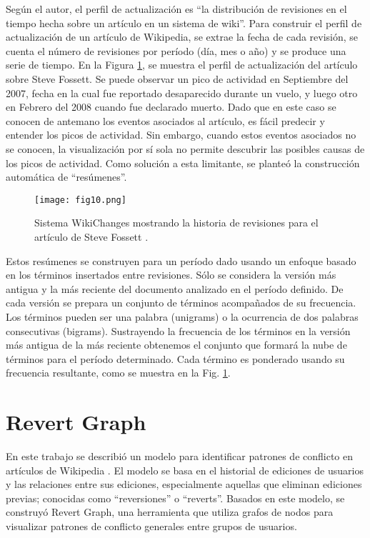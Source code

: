 Según el autor, el perfil de actualización es “la distribución de revisiones en el tiempo hecha sobre un artículo en un sistema de wiki”. Para construir el perfil de actualización de un artículo de Wikipedia, se extrae la fecha de cada revisión, se cuenta el número de revisiones por período (día, mes o año) y se produce una serie de tiempo.
En la Figura \ref{fig:fig10}, se muestra el perfil de actualización del artículo sobre Steve Fossett. Se puede observar un pico de actividad en Septiembre del 2007, fecha en la cual fue reportado desaparecido durante un vuelo, y luego otro en Febrero del 2008 cuando fue declarado muerto. Dado que en este caso se conocen de antemano los eventos asociados al artículo, es fácil predecir y entender los picos de actividad. Sin embargo, cuando estos eventos asociados no se conocen, la visualización por sí sola no permite descubrir las posibles causas de los picos de actividad. Como solución a esta limitante, se planteó la construcción automática de “resúmenes”.

\begin{figure}[htp]
  \centering
  \texttt{[image: fig10.png]}
  \caption[Sistema WikiChanges mostrando la historia de revisiones para el artículo de Steve Fossett]{Sistema WikiChanges mostrando la historia de revisiones para el artículo de Steve Fossett \cite[Fig. 3]{Nun08}.}
  \label{fig:fig10}
\end{figure}

Estos resúmenes se construyen para un período dado usando un enfoque basado en los términos insertados entre revisiones. Sólo se considera la versión más antigua y la más reciente del documento analizado en el período definido. De cada versión se prepara un conjunto de términos acompañados de su frecuencia. Los términos pueden ser una palabra (unigrams) o  la ocurrencia de dos palabras consecutivas (bigrams). Sustrayendo la frecuencia de los términos en la versión más antigua de la más reciente obtenemos el conjunto que formará la nube de términos para el período determinado. Cada término es ponderado usando su frecuencia resultante, como se muestra en la Fig. \ref{fig:fig10}.

\section{Revert Graph}
En este trabajo se describió un modelo para identificar patrones de conflicto en artículos de Wikipedia \cite{Suh07}. El modelo se basa en el historial de ediciones de usuarios y las relaciones entre sus ediciones, especialmente aquellas que eliminan ediciones previas; conocidas como “reversiones” o “reverts”. Basados en este modelo, se construyó Revert Graph, una herramienta que utiliza grafos de nodos para visualizar patrones de conflicto generales entre grupos de usuarios.

